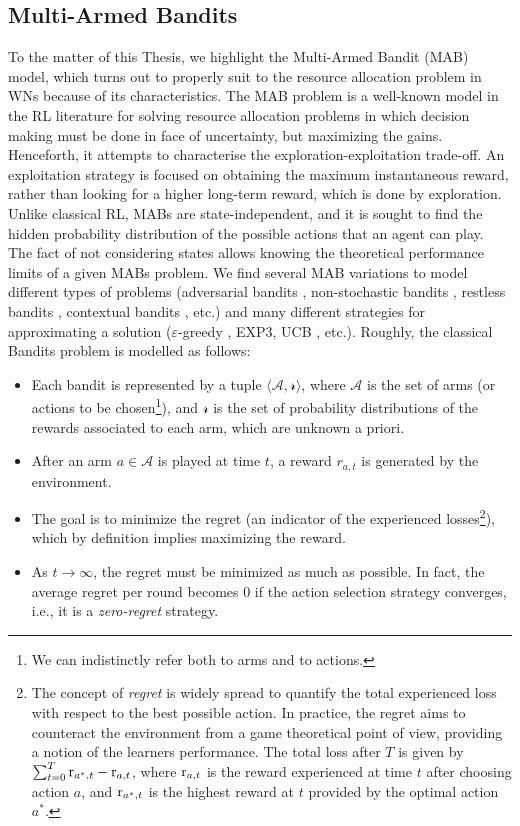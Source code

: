 \documentclass[12pt, a4paper,twoside]{tesi_upf}
\begin{document}
			\subsection{Multi-Armed Bandits}		
			\label{section:mabs}
				To the matter of this Thesis, we highlight the Multi-Armed Bandit (MAB) model, which turns out to properly suit to the resource allocation problem in WNs because of its characteristics. The MAB problem \cite{auer2002finite, katehakis1987multi} is a well-known model in the RL literature for solving resource allocation problems in which decision making must be done in face of uncertainty, but maximizing the gains. Henceforth, it attempts to characterise the exploration-exploitation trade-off. An exploitation strategy is focused on obtaining the maximum instantaneous reward, rather than looking for a higher long-term reward, which is done by exploration. Unlike classical RL, MABs are state-independent, and it is sought to find the hidden probability distribution of the possible actions that an agent can play. The fact of not considering states allows knowing the theoretical performance limits of a given MABs problem. We find several MAB variations to model different types of problems (adversarial bandits \cite{auer1995gambling}, non-stochastic bandits \cite{kale2010non}, restless bandits \cite{whittle1988restless}, contextual bandits \cite{abe2003reinforcement}, etc.) and many different strategies for approximating a solution ($\varepsilon$-greedy \cite{sutton1998reinforcement}, EXP3, UCB \cite{auer2002nonstochastic}, etc.). Roughly, the classical Bandits problem is modelled as follows:	
				\begin{itemize}
					\item Each bandit is represented by a tuple $\langle \mathcal{A}, \mathcal{r} \rangle$, where $\mathcal{A}$ is the set of arms (or actions to be chosen\footnote{We can indistinctly refer both to arms and to actions.}), and $\mathcal{r}$ is the set of probability distributions of the rewards associated to each arm, which are unknown a priori.
					\item After an arm $a \in \mathcal{A}$ is played at time $t$, a reward $r_{a,t}$ is generated by the environment.
					\item The goal is to minimize the regret (an indicator of the experienced losses\footnote{The concept of \textit{regret} is widely spread to quantify the total experienced loss with respect to the best possible action. In practice, the regret aims to counteract the environment from a game theoretical point of view, providing a notion of the learners performance. The total loss after $T$ is given by $\sum_{t=0}^{T} {\rm r}_{a^*,t} - {\rm r}_{a,t}$, where ${\rm r}_{a,t}$ is the reward experienced at time $t$ after choosing action $a$, and ${\rm r}_{a^*,t}$ is the highest reward at $t$ provided by the optimal action $a^*$.}), which by definition implies maximizing the reward.
					\item As $t \rightarrow \infty$, the regret must be minimized as much as possible. In fact, the average regret per round becomes 0 if the action selection strategy converges, i.e., it is a \textit{zero-regret} strategy.
				\end{itemize}				
				
\end{document}

